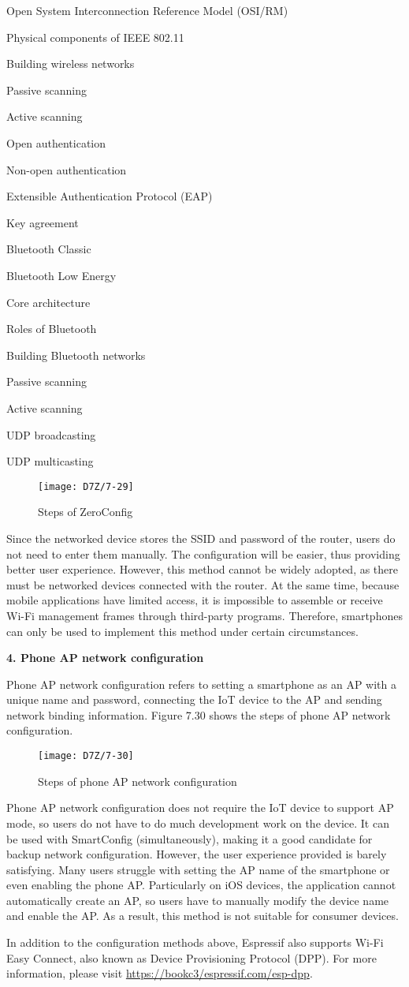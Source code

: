 \documentclass[a4paper,12pt]{book}
\begin{document}
\begin{term}{Open System Interconnection Reference Model (OSI/RM)}
\begin{term}{Physical components of IEEE 802.11}
\begin{term}{Building wireless networks}
\begin{term}{Passive scanning}
\begin{term}{Active scanning}
\begin{term}{Open authentication}
\begin{term}{Non-open authentication}
\begin{term}{Extensible Authentication Protocol (EAP)}
\begin{term}{Key agreement}
\begin{term}{Bluetooth Classic}
\begin{term}{Bluetooth Low Energy}
\begin{term}{Core architecture}
\begin{term}{Roles of Bluetooth}
\begin{term}{Building Bluetooth networks}
\begin{term}{Passive scanning}
\begin{term}{Active scanning}
\begin{term}{UDP broadcasting}
\begin{term}{UDP multicasting}
\begin{figure}[!h]
    \centering
    \texttt{[image: D7Z/7-29]}
    \caption{Steps of ZeroConfig}
\end{figure}

Since the networked device stores the SSID and password of the router, users do not need to enter them manually. The configuration will be easier, thus providing better user experience. However, this method cannot be widely adopted, as there must be networked devices connected with the router. At the same time, because mobile applications have limited access, it is impossible to assemble or receive Wi-Fi management frames through third-party programs. Therefore, smartphones can only be used to implement this method under certain circumstances.

\textbf{4. Phone AP network configuration}

Phone AP network configuration refers to setting a smartphone as an AP with a unique name and password, connecting the IoT device to the AP and sending network binding information. Figure 7.30 shows the steps of phone AP network configuration.

\begin{figure}[!h]
    \centering
    \texttt{[image: D7Z/7-30]}
    \caption{Steps of phone AP network configuration}
\end{figure}

Phone AP network configuration does not require the IoT device to support AP mode, so users do not have to do much development work on the device. It can be used with SmartConfig (simultaneously), making it a good candidate for backup network configuration. However, the user experience provided is barely satisfying. Many users struggle with setting the AP name of the smartphone or even enabling the phone AP. Particularly on iOS devices, the application cannot automatically create an AP, so users have to manually modify the device name and enable the AP. As a result, this method is not suitable for consumer devices.

In addition to the configuration methods above, Espressif also supports Wi-Fi Easy Connect, also known as Device Provisioning Protocol (DPP). For more information, please visit \url{https://bookc3/espressif.com/esp-dpp}.


\end{term}
\end{term}
\end{term}
\end{term}
\end{term}
\end{term}
\end{term}
\end{term}
\end{term}
\end{term}
\end{term}
\end{term}
\end{term}
\end{term}
\end{term}
\end{term}
\end{term}
\end{term}
\end{document}
